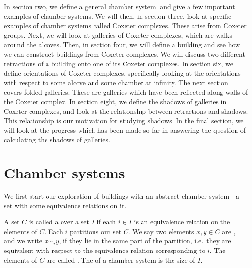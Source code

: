\documentclass[11pt]{article}
\begin{document}



In section two, we define a general chamber system, and give a few important examples of chamber systems. We will then, in section three, look at specific examples of chamber systems called Coxeter complexes. These arise from Coxeter groups. Next, we will look at galleries of Coxeter complexes, which are walks around the alcoves. Then, in section four, we will define a building and see how we can construct buildings from Coxeter complexes. We will discuss two different retractions of a building onto one of its Coxeter complexes. In section six, we define orientations of Coxeter complexes, specifically looking at the orientations with respect to some alcove and some chamber at infinity. The next section covers folded galleries. These are galleries which have been reflected along walls of the Coxeter complex. In section eight, we define the shadows of galleries in Coxeter complexes, and look at the relationship between retractions and shadows. This relationship is our motivation for studying shadows. In the final section, we will look at the progress which has been made so far in answering the question of calculating the shadows of galleries. 




\section{Chamber systems}
We first start our exploration of buildings with an abstract chamber system - a set with some equivalence relations on it.  

\begin{definition}
    A set $C$ is called a  over a set $I$ if each $i\in I$ is an equivalence relation on the elements of $C$. Each $i$ partitions our set $C$. We say two elements $x,y\in C$ are , and we write $x\sim_{i} y$, if they lie in the same part of the partition, i.e.\ they are equivalent with respect to the equivalence relation corresponding to $i$. The elements of $C$ are called . The  of a chamber system is the size of $I$. 
\end{definition}
\end{document}
